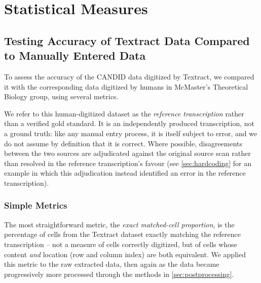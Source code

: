\documentclass[12pt]{article}
\begin{document}
\section{Statistical Measures} \label{sec:measuresAccuracy}

\subsection{Testing Accuracy of Textract Data Compared to Manually Entered Data}
To assess the accuracy of the CANDID data digitized by Textract, we compared it with the corresponding data digitized by humans in McMaster's Theoretical Biology group, using several metrics.

We refer to this human-digitized dataset as the \emph{reference transcription} rather than a verified gold standard. It is an independently produced transcription, not a ground truth: like any manual entry process, it is itself subject to error, and we do not assume by definition that it is correct. Where possible, disagreements between the two sources are adjudicated against the original source scan rather than resolved in the reference transcription's favour (see \cref{sec:hardcoding} for an example in which this adjudication instead identified an error in the reference transcription).

\subsubsection{Simple Metrics}
The most straightforward metric, the \emph{exact matched-cell proportion}, is the percentage of cells from the Textract dataset exactly matching the reference transcription -- not a measure of cells correctly digitized, but of cells whose content \emph{and} location (row and column index) are both equivalent. We applied this metric to the raw extracted data, then again as the data became progressively more processed through the methods in \cref{sec:postprocessing}.
\end{document}
